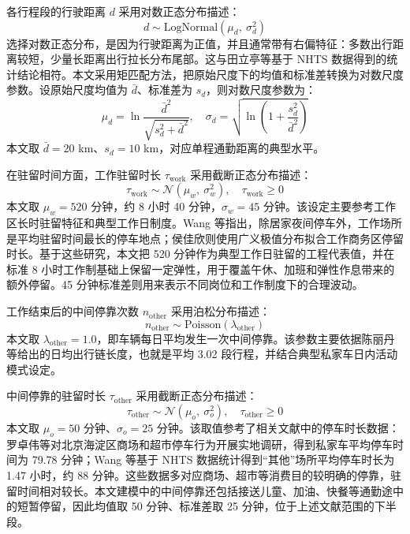 \documentclass[10pt,a4paper]{article}
\numberwithin{equation}{section}
\numberwithin{table}{section}
\numberwithin{figure}{section}
\begin{document}
    各行程段的行驶距离 $d$ 采用对数正态分布描述：
    \begin{equation}
    \label{eq:dist_lognormal}
    d \sim \text{LogNormal}(\mu_d,\ \sigma_d^2)
    \end{equation}
    选择对数正态分布，是因为行驶距离为正值，并且通常带有右偏特征：多数出行距离较短，少量长距离出行拉长分布尾部。这与田立亭等\supercite{ref7}基于 NHTS 数据得到的统计结论相符。本文采用矩匹配方法，把原始尺度下的均值和标准差转换为对数尺度参数。设原始尺度均值为 $\bar{d}$、标准差为 $s_d$，则对数尺度参数为：
    \begin{equation}
    \label{eq:lognormal_params}
    \mu_d = \ln\frac{\bar{d}^2}{\sqrt{s_d^2 + \bar{d}^2}}, \quad \sigma_d = \sqrt{\ln\left(1 + \frac{s_d^2}{\bar{d}^2}\right)}
    \end{equation}
    本文取 $\bar{d} = 20$ km、$s_d = 10$ km，对应单程通勤距离的典型水平。

    在驻留时间方面，工作驻留时长 $\tau_{\text{work}}$ 采用截断正态分布描述：
    \begin{equation}
    \label{eq:work_duration_dist}
    \tau_{\text{work}} \sim \mathcal{N}(\mu_w,\ \sigma_w^2), \quad \tau_{\text{work}} \geq 0
    \end{equation}
    本文取 $\mu_w = 520$ 分钟，约 8 小时 40 分钟，$\sigma_w = 45$ 分钟。该设定主要参考工作区长时驻留特征和典型工作日制度。Wang 等\supercite{ref11}指出，除居家夜间停车外，工作场所是平均驻留时间最长的停车地点；侯佳欣\supercite{ref15}则使用广义极值分布拟合工作商务区停留时长。基于这些研究，本文把 520 分钟作为典型工作日驻留的工程代表值，并在标准 8 小时工作制基础上保留一定弹性，用于覆盖午休、加班和弹性作息带来的额外停留。45 分钟标准差则用来表示不同岗位和工作制度下的合理波动。

    工作结束后的中间停靠次数 $n_{\text{other}}$ 采用泊松分布描述：
    \begin{equation}
    \label{eq:other_stops_dist}
    n_{\text{other}} \sim \text{Poisson}(\lambda_{\text{other}})
    \end{equation}
    本文取 $\lambda_{\text{other}} = 1.0$，即车辆每日平均发生一次中间停靠。该参数主要依据陈丽丹等\supercite{ref9}给出的日均出行链长度，也就是平均 3.02 段行程，并结合典型私家车日内活动模式设定。

    中间停靠的驻留时长 $\tau_{\text{other}}$ 采用截断正态分布描述：
    \begin{equation}
    \label{eq:other_duration_dist}
    \tau_{\text{other}} \sim \mathcal{N}(\mu_o,\ \sigma_o^2), \quad \tau_{\text{other}} \geq 0
    \end{equation}
    本文取 $\mu_o = 50$ 分钟、$\sigma_o = 25$ 分钟。该取值参考了相关文献中的停车时长数据：罗卓伟等\supercite{ref8}对北京海淀区商场和超市停车行为开展实地调研，得到私家车平均停车时间为 79.78 分钟；Wang 等\supercite{ref11}基于 NHTS 数据统计得到“其他”场所平均停车时长为 1.47 小时，约 88 分钟。这些数据多对应商场、超市等消费目的较明确的停靠，驻留时间相对较长。本文建模中的中间停靠还包括接送儿童、加油、快餐等通勤途中的短暂停留，因此均值取 50 分钟、标准差取 25 分钟，位于上述文献范围的下半段。
\end{document}
